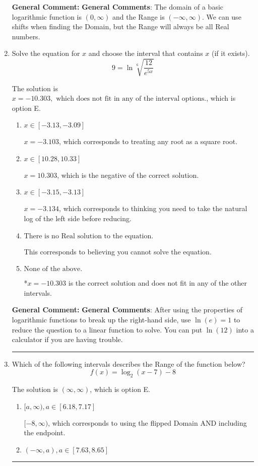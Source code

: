 \documentclass{extbook}[14pt]
\newcommand{\litem}[1]{\item #1

\rule{\textwidth}{0.4pt}}
\begin{document}
\begin{enumerate}
{\textbf{General Comment:} \textbf{General Comments}: The domain of a basic logarithmic function is $(0, \infty)$ and the Range is $(-\infty, \infty)$. We can use shifts when finding the Domain, but the Range will always be all Real numbers.
}
\litem{
 Solve the equation for $x$ and choose the interval that contains $x$ (if it exists).
\[  9 = \ln{\sqrt[6]{\frac{12}{e^{5x}}}} \]

The solution is \( x = -10.303, \text{ which does not fit in any of the interval options.} \), which is option E.\begin{enumerate}[label=\Alph*.]
\item \( x \in [-3.13, -3.09] \)

$x = -3.103$, which corresponds to treating any root as a square root.
\item \( x \in [10.28, 10.33] \)

$x = 10.303$, which is the negative of the correct solution.
\item \( x \in [-3.15, -3.13] \)

$x = -3.134$, which corresponds to thinking you need to take the natural log of the left side before reducing.
\item \( \text{There is no Real solution to the equation.} \)

This corresponds to believing you cannot solve the equation.
\item \( \text{None of the above.} \)

*$x = -10.303$ is the correct solution and does not fit in any of the other intervals.
\end{enumerate}

\textbf{General Comment:} \textbf{General Comments}: After using the properties of logarithmic functions to break up the right-hand side, use $\ln(e) = 1$ to reduce the question to a linear function to solve. You can put $\ln(12)$ into a calculator if you are having trouble.
}
\litem{
Which of the following intervals describes the Range of the function below?
\[ f(x) = \log_2{(x-7)}-8 \]

The solution is \( (\infty, \infty) \), which is option E.\begin{enumerate}[label=\Alph*.]
\item \( [a, \infty), a \in [6.18, 7.17] \)

$[-8, \infty)$, which corresponds to using the flipped Domain AND including the endpoint.
\item \( (-\infty, a), a \in [7.63, 8.65] \)


\end{enumerate}}
\end{enumerate}
\end{document}
